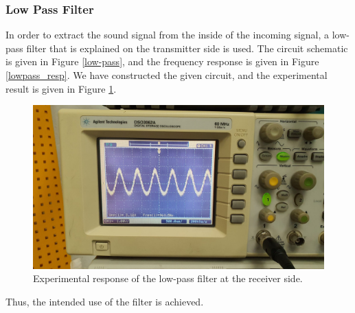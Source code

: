 \documentclass[a4paper,10pt]{IEEEtran}
\begin{document}
\subsubsection{Low Pass Filter}
In order to extract the sound signal from the inside of the incoming signal, a low-pass filter that is explained on the transmitter side is used. The circuit schematic is given in Figure \ref{low-pass}, and the frequency response is given in Figure \ref{lowpass_resp}. We have constructed the given circuit, and the experimental result is given in Figure \ref{lowpass_osc}.
\begin{figure}[htbp!]
    \centering
    \includegraphics[width = 1\linewidth]{receiver_lowpass_experimental.jpeg}
    \caption{Experimental response of the low-pass filter at the receiver side. }
    \label{lowpass_osc}
\end{figure} 
Thus, the intended use of the filter is achieved.
\end{document}
